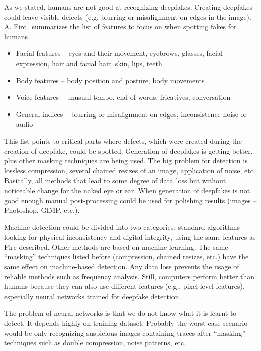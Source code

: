As we stated, humans are not good at recognizing deepfakes. Creating deepfakes could leave visible defects (e.g. blurring or misalignment on edges in the image). A. Firc~\cite{ApplicabilityOfDeepfakes} summarizes the list of features to focus on when spotting fakes for humans.

\begin{itemize}
\item Facial features – eyes and their movement, eyebrows, glasses, facial expression, hair and facial hair, skin, lips, teeth
\item Body features – body position and posture, body movements
\item Voice features – unusual tempo, end of words, fricatives, conversation
\item General indices – blurring or misalignment on edges, inconsistence noise or audio
\end{itemize}
	
This list points to critical parts where defects, which were created during the creation of deepfake, could be spotted. Generation of deepfakes is getting better, plus other masking techniques are being used. The big problem for detection is lossless compression, several chained resizes of an image, application of noise, etc. Basically, all methods that lead to some degree of data loss but without noticeable change for the naked eye or ear. When generation of deepfakes is not good enough manual post-processing could be used for polishing results (images – Photoshop, GIMP, etc.). 

Machine detection could be divided into two categories: standard algorithms looking for physical inconsistency and digital integrity, using the same features as Firc described. Other methods are based on machine learning. The same “masking” techniques listed before (compression, chained resizes, etc.) have the same effect on machine-based detection. Any data loss prevents the usage of reliable methods such as frequency analysis. Still, computers perform better than humans because they can also use different features (e.g., pixel-level features), especially neural networks trained for deepfake detection. ~\cite{MediaForensicsandDeepFakes}

The problem of neural networks is that we do not know what it is learnt to detect. It depends highly on training dataset. Probably the worst case scenario would be only recognizing suspicious images containing traces after “masking” techniques such as double compression, noise patterns, etc.

